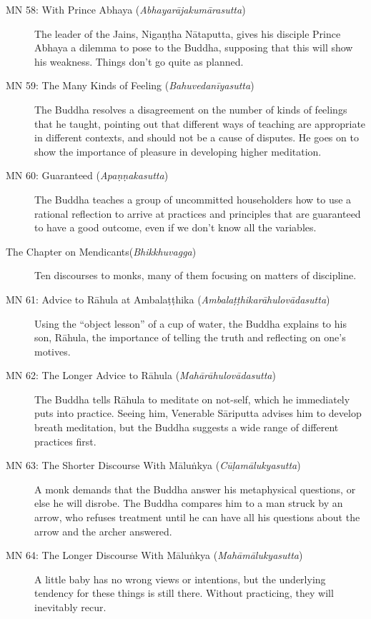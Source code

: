 \documentclass[12pt,openany]{book}%
\begin{document}
\begin{description}
\item[MN 58: With Prince Abhaya (\textit{\textsanskrit{Abhayarājakumārasutta}})] The leader of the Jains, \textsanskrit{Nigaṇṭha} \textsanskrit{Nātaputta}, gives his disciple Prince Abhaya a dilemma to pose to the Buddha, supposing that this will show his weakness. Things don’t go quite as planned.%
\item[MN 59: The Many Kinds of Feeling (\textit{\textsanskrit{Bahuvedanīyasutta}})] The Buddha resolves a disagreement on the number of kinds of feelings that he taught, pointing out that different ways of teaching are appropriate in different contexts, and should not be a cause of disputes. He goes on to show the importance of pleasure in developing higher meditation.%
\item[MN 60: Guaranteed (\textit{\textsanskrit{Apaṇṇakasutta}})] The Buddha teaches a group of uncommitted householders how to use a rational reflection to arrive at practices and principles that are guaranteed to have a good outcome, even if we don’t know all the variables.%
\item[The Chapter on Mendicants(\textit{\textsanskrit{Bhikkhuvagga}})] Ten discourses to monks, many of them focusing on matters of discipline.%
\item[MN 61: Advice to \textsanskrit{Rāhula} at \textsanskrit{Ambalaṭṭhika} (\textit{\textsanskrit{Ambalaṭṭhikarāhulovādasutta}})] Using the “object lesson” of a cup of water, the Buddha explains to his son, \textsanskrit{Rāhula}, the importance of telling the truth and reflecting on one’s motives.%
\item[MN 62: The Longer Advice to \textsanskrit{Rāhula} (\textit{\textsanskrit{Mahārāhulovādasutta}})] The Buddha tells \textsanskrit{Rāhula} to meditate on not-self, which he immediately puts into practice. Seeing him, Venerable \textsanskrit{Sāriputta} advises him to develop breath meditation, but the Buddha suggests a wide range of different practices first.%
\item[MN 63: The Shorter Discourse With \textsanskrit{Māluṅkya} (\textit{\textsanskrit{Cūḷamālukyasutta}})] A monk demands that the Buddha answer his metaphysical questions, or else he will disrobe. The Buddha compares him to a man struck by an arrow, who refuses treatment until he can have all his questions about the arrow and the archer answered.%
\item[MN 64: The Longer Discourse With \textsanskrit{Māluṅkya} (\textit{\textsanskrit{Mahāmālukyasutta}})] A little baby has no wrong views or intentions, but the underlying tendency for these things is still there. Without practicing, they will inevitably recur.%

\end{description}
\end{document}
